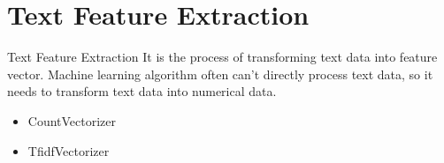 \documentclass[
 size=12pt,
 paper=smartboard, %
 mode=present, %
 display=slides, %
style=tuliplab,
pauseslide,
fleqn,leqno]{powerdot}
\begin{document}

\section{Text Feature Extraction}

\begin{slide}[toc=,bm=]{Text Feature Extraction}
  \hspace{0.5cm}  It is the process of transforming text data into feature vector. Machine learning algorithm often can't directly process text data, so it needs to transform text data into numerical data.
\begin{itemize}
  \item CountVectorizer \ 

  \item  TfidfVectorizer
\end{itemize}
\end{slide}
\end{document}
